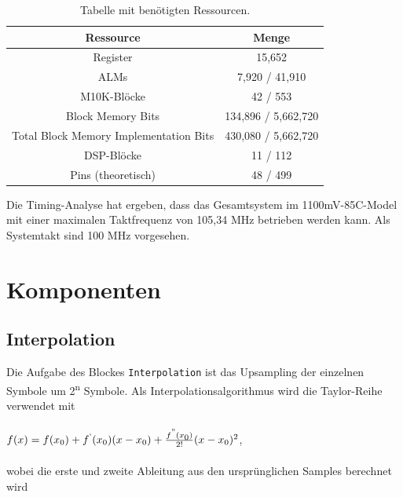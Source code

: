 \begin{table}[H]
\centering
\begin{tabular}{|c|c|}
\hline
\textbf{Ressource} & \textbf{Menge} \\ \hline
Register & 15,652 \\ \hline
ALMs & 7,920 / 41,910 \\ \hline
M10K-Blöcke & 42 / 553 \\ \hline
Block Memory Bits & 134,896 / 5,662,720 \\ \hline
Total Block Memory Implementation Bits & 430,080 / 5,662,720 \\ \hline
DSP-Blöcke & 11 / 112 \\ \hline
Pins (theoretisch) & 48 / 499 \\ \hline
\end{tabular}
\caption{Tabelle mit benötigten Ressourcen.}
\label{tab:resources_coarse}
\end{table}

Die Timing-Analyse hat ergeben, dass das Gesamtsystem im 1100mV-85C-Model mit einer maximalen Taktfrequenz von 105,34 MHz betrieben werden kann. Als Systemtakt sind 100 MHz vorgesehen.

\section{Komponenten}

\subsection{Interpolation}
Die Aufgabe des Blockes \texttt{Interpolation} ist das Upsampling der einzelnen Symbole um 2\textsuperscript{n} Symbole. Als Interpolationsalgorithmus wird die Taylor-Reihe verwendet mit
\\
\\

$ f(x)=f(x\textsubscript{0}	) +f\textsuperscript{'} (x\textsubscript{0}) (x-x\textsubscript{0})+\frac{f\textsuperscript{''}(x\textsubscript{0})}{2!}(x-x\textsubscript{0})\textsuperscript{2} $,
\\
\\

\noindent wobei die erste und zweite Ableitung aus den ursprünglichen Samples berechnet wird



